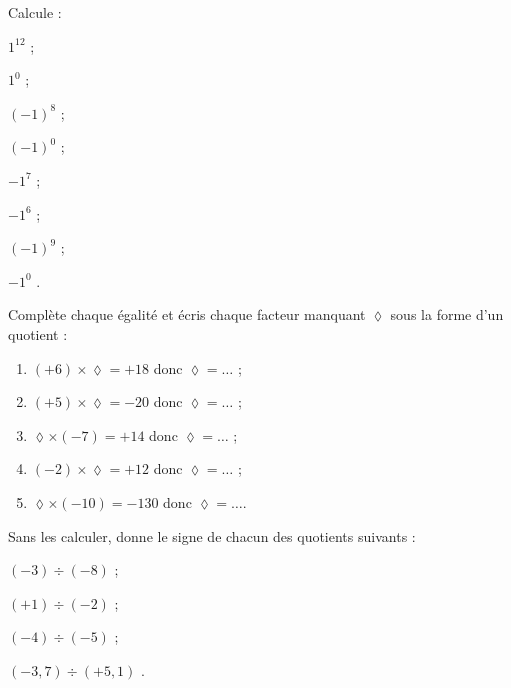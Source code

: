 \begin{exercice}[Puissance de 1 ou de $-1$]
Calcule :
\begin{colenumerate}{4}
 \item $1^{12}$  \dotfill;
 \item $1^{0}$  \dotfill;
 \item $(-1)^{8}$  \dotfill;
 \item $(-1)^{0}$  \dotfill;
 \item $-1^{7}$  \dotfill;
 \item $-1^{6}$  \dotfill;
 \item $(-1)^{9}$  \dotfill;
 \item $-1^{0}$ \dotfill.
 \end{colenumerate}
\end{exercice}



\begin{exercice}
Complète chaque égalité et écris chaque facteur manquant $\lozenge$ sous la forme d'un quotient :
\begin{enumerate}
 \item $(+6) \times \lozenge = +18$ donc $\lozenge = \ldots$ ;
 \item $(+5) \times \lozenge = -20$ donc $\lozenge = \ldots$ ;
 \item $\lozenge \times (-7) = +14$ donc  $\lozenge = \ldots$ ;
 \item $(-2) \times \lozenge = +12$ donc  $\lozenge = \ldots$ ;
 \item $\lozenge \times (-10) = -130$ donc  $\lozenge = \ldots$.
 \end{enumerate}
\end{exercice}


\begin{exercice}
Sans les calculer, donne le signe de chacun des quotients suivants :
\begin{colenumerate}{2}
 \item $(-3) \div (-8)$  \dotfill;
 \item $(+1) \div (-2)$  \dotfill;
 \item $(-4) \div (-5)$  \dotfill;
 \item $(-3,7) \div (+5,1)$ \dotfill.
 \end{colenumerate}
\end{exercice}


